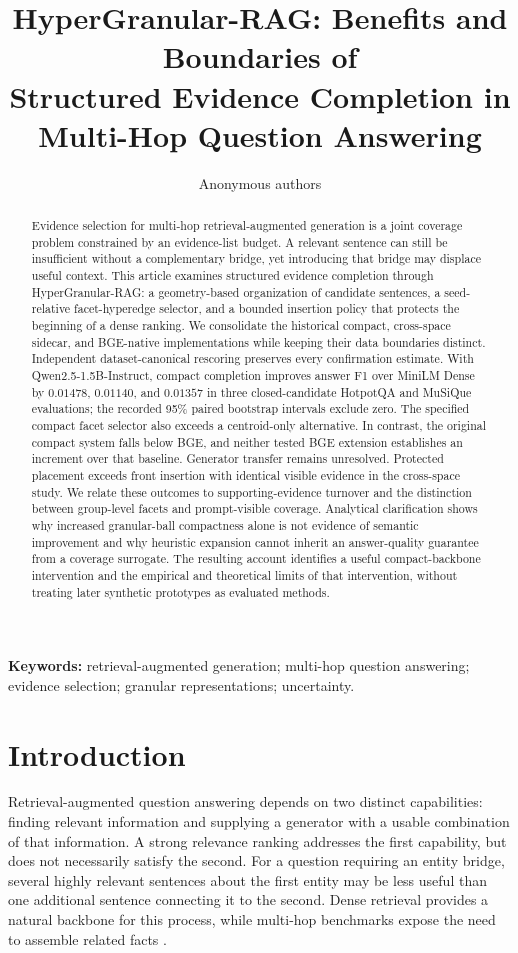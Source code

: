 \documentclass[11pt,a4paper]{article}
\title{HyperGranular-RAG: Benefits and Boundaries of\\
Structured Evidence Completion in Multi-Hop Question Answering}
\author{Anonymous authors}
\date{}
\newcommand{\hgrag}{HyperGranular-RAG\xspace}
\begin{document}
\maketitle
\begin{abstract}
Evidence selection for multi-hop retrieval-augmented generation is a joint
coverage problem constrained by an evidence-list budget. A relevant sentence can
still be insufficient without a complementary bridge, yet introducing that
bridge may displace useful context. This article examines structured evidence
completion through \hgrag: a geometry-based organization of candidate
sentences, a seed-relative facet-hyperedge selector, and a bounded insertion
policy that protects the beginning of a dense ranking.
We consolidate the historical compact, cross-space sidecar, and BGE-native
implementations while keeping their data boundaries distinct. Independent
dataset-canonical rescoring preserves every confirmation estimate.
With Qwen2.5-1.5B-Instruct, compact completion improves answer F1
over MiniLM Dense by $0.01478$, $0.01140$, and $0.01357$ in three
closed-candidate HotpotQA and MuSiQue evaluations; the recorded 95\%
paired bootstrap intervals exclude zero. The specified compact facet
selector also exceeds a centroid-only alternative. In contrast, the original
compact system falls below BGE, and neither tested BGE extension establishes
an increment over that baseline. Generator transfer remains unresolved.
Protected placement exceeds front insertion with identical visible evidence
in the cross-space study. We relate these outcomes to supporting-evidence
turnover and the distinction between group-level facets and prompt-visible
coverage. Analytical clarification shows why increased granular-ball compactness
alone is not evidence of semantic improvement and why heuristic expansion
cannot inherit an answer-quality guarantee from a coverage surrogate.
The resulting account identifies a useful compact-backbone intervention and
the empirical and theoretical limits of that intervention, without treating
later synthetic prototypes as evaluated methods.
\end{abstract}
\noindent\textbf{Keywords:} retrieval-augmented generation; multi-hop question
answering; evidence selection; granular representations; uncertainty.

\section{Introduction}
Retrieval-augmented question answering depends on two distinct capabilities:
finding relevant information and supplying a generator with a usable
combination of that information. A strong relevance ranking addresses the
first capability, but does not necessarily satisfy the second. For a question
requiring an entity bridge, several highly relevant sentences about the first
entity may be less useful than one additional sentence connecting it to the
second. Dense retrieval \citep{karpukhin2020dpr} provides a natural backbone
for this process, while multi-hop benchmarks expose the need to assemble
related facts \citep{yang2018hotpotqa,trivedi2022musique}.
\end{document}

